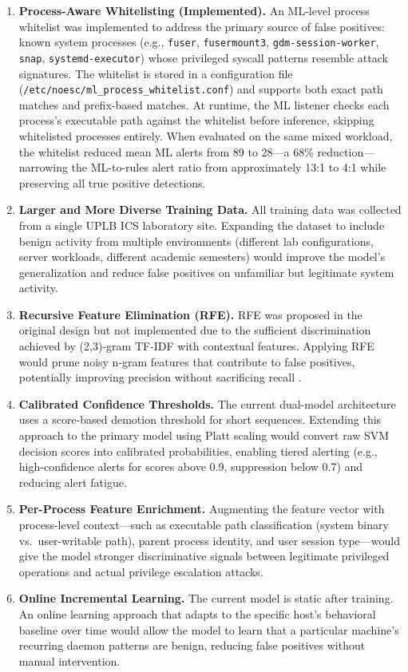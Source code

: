 \documentclass[journal]{./IEEEtran}
\begin{document}
\begin{enumerate}
    \item \textbf{Process-Aware Whitelisting (Implemented).} An ML-level process whitelist was implemented to address the primary source of false positives: known system processes (e.g., \texttt{fuser}, \texttt{fusermount3}, \texttt{gdm-session-worker}, \texttt{snap}, \texttt{systemd-executor}) whose privileged syscall patterns resemble attack signatures. The whitelist is stored in a configuration file (\texttt{/etc/noesc/ml\_process\_whitelist.conf}) and supports both exact path matches and prefix-based matches. At runtime, the ML listener checks each process's executable path against the whitelist before inference, skipping whitelisted processes entirely. When evaluated on the same mixed workload, the whitelist reduced mean ML alerts from 89 to 28---a 68\% reduction---narrowing the ML-to-rules alert ratio from approximately 13:1 to 4:1 while preserving all true positive detections.

    \item \textbf{Larger and More Diverse Training Data.} All training data was collected from a single UPLB ICS laboratory site. Expanding the dataset to include benign activity from multiple environments (different lab configurations, server workloads, different academic semesters) would improve the model's generalization and reduce false positives on unfamiliar but legitimate system activity.

    \item \textbf{Recursive Feature Elimination (RFE).} RFE was proposed in the original design but not implemented due to the sufficient discrimination achieved by (2,3)-gram TF-IDF with contextual features. Applying RFE would prune noisy n-gram features that contribute to false positives, potentially improving precision without sacrificing recall \cite{patel2024}.

    \item \textbf{Calibrated Confidence Thresholds.} The current dual-model architecture uses a score-based demotion threshold for short sequences. Extending this approach to the primary model using Platt scaling would convert raw SVM decision scores into calibrated probabilities, enabling tiered alerting (e.g., high-confidence alerts for scores above 0.9, suppression below 0.7) and reducing alert fatigue.

    \item \textbf{Per-Process Feature Enrichment.} Augmenting the feature vector with process-level context---such as executable path classification (system binary vs.\ user-writable path), parent process identity, and user session type---would give the model stronger discriminative signals between legitimate privileged operations and actual privilege escalation attacks.

    \item \textbf{Online Incremental Learning.} The current model is static after training. An online learning approach that adapts to the specific host's behavioral baseline over time would allow the model to learn that a particular machine's recurring daemon patterns are benign, reducing false positives without manual intervention.
\end{enumerate}
\end{document}
